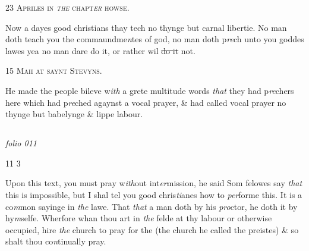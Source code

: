 \documentclass[12pt, a4paper]{book}
\begin{document}
               
                  
				\begin{center}  {\scshape 
                     23 Apriles in \textit{the} chapt\textit{er} howse.}  \end{center}
			


				\marginpar[\vspace{0.5cm}{\textcolor{Gray}{sclanderous n}}]{}
			
		\ifthenelse{\isodd{\thepage}}
		{\reversemarginpar}
		{\normalmarginpar}
		 Now a dayes good christians thay tech no thynge but
 carnal libertie. No man doth teach you the commaundme\textit{n}tes of god, no man doth p\textit{re}ch unto you goddes lawes
 yea no man dare do it, or rather wil \sout{do it} not.
 

               
                  
				\begin{center}  {\scshape 
                     15 Maii at saynt Stevyns.}  \end{center}
			

 
				\marginpar[\vspace{0.5cm}{\textcolor{Gray}{sclanderous}}]{}
			
		\ifthenelse{\isodd{\thepage}}
		{\reversemarginpar}
		{\normalmarginpar}
		He made the people bileve w\textit{ith} a grete multitude words
 \textit{that} they had p\textit{re}chers here which had p\textit{re}ched agaynst a
 vocal prayer, \& had called vocal prayer no thynge but
 babelynge \& lippe labour.
 



\dotfill
						\newpage {} \subsection*{}

\textit{folio 011}


\begin{flushright}{\color{Mahogany}11} 3\end{flushright}

				\marginpar[\vspace{0.5cm}{\textcolor{Gray}{n}}]{}
			
		\ifthenelse{\isodd{\thepage}}
		{\reversemarginpar}
		{\normalmarginpar}
		 Upon this text, you must pray w\textit{ith}out int\textit{er}mission, he said
 Som felowes say \textit{that} this is impossible, but I shal tel you
 good chris\textit{ti}anes how to \textit{per}forme this. It is a co\textit{m}mon sayinge
 in \textit{the} lawe. That \textit{that} a man doth by his \textit{pro}ctor, he doth
 it by hy\textit{m}selfe. Wherfore whan thou art in \textit{the} felde at
 thy labour or otherwise occupied, hire \textit{the} church to
 pray for the (the church he called the preistes) \& so shalt
 thou co\textit{n}tinually pray.
	
\end{document}
